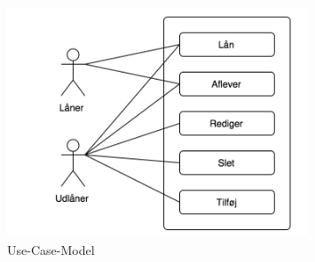 \documentclass[a4paper]{article}
\begin{document}
\begin{figure}[h!]
  \caption{Use-Case-Model}
  \centering
    \includegraphics[width=0.8\textwidth]{UseCaseModel}
\end{figure} 
\end{document}
